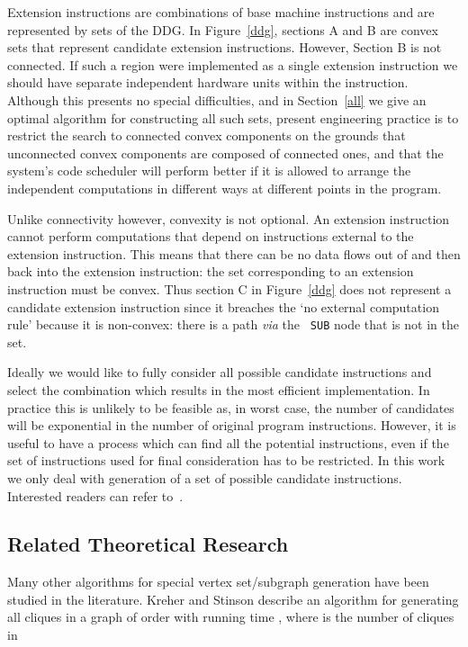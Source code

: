 \documentclass[11pt]{article}
\newcommand{\2}{\vspace{0.2 cm}}
\begin{document}
Extension instructions are combinations of base machine instructions
and are represented by sets of the DDG. In Figure~\ref{ddg},
sections A and B are convex sets that represent candidate extension
instructions. However, Section B is not connected.  If such a region
were implemented as a single extension instruction we should have
separate independent hardware units within the instruction. Although
this presents no special difficulties, and in Section~\ref{all} we
give an optimal algorithm for constructing all such sets, present
engineering practice is to restrict the search to connected convex
components on the grounds that unconnected convex components are
composed of connected ones, and that the system's code scheduler
will perform better if it is allowed to arrange the independent
computations in different ways at different points in the program.

Unlike connectivity however, convexity is not optional. An extension
instruction cannot perform computations that depend on instructions
external to the extension instruction. This means that there can be
no data flows out of and then back into the extension instruction:
the set corresponding to an extension instruction must be convex.
Thus section C in Figure~\ref{ddg} does not represent a candidate
extension instruction since it breaches the `no external computation
rule' because it is non-convex: there is a path {\em via} the {\tt
SUB} node that is not in the set.



Ideally we would like to fully consider all possible candidate
instructions and select the combination which results in the most
efficient implementation. In practice this is unlikely to be
feasible as, in worst case, the number of candidates will be
exponential in the number of original program instructions. However,
it is useful to have a process which can find all the potential
instructions, even if the set of instructions used for final
consideration has to be restricted. In this work we only deal with
generation of a set of possible candidate instructions. Interested
readers can refer to~\cite{atasu2006,yu}.




\subsection{ Related Theoretical Research}\label{rtrsec}

Many other algorithms for special vertex set/subgraph generation
have been studied in the literature. Kreher and Stinson
\cite{kreher} describe an algorithm for generating all cliques in a
graph  of order  with running time , where
 is the number of cliques in 
\end{document}
